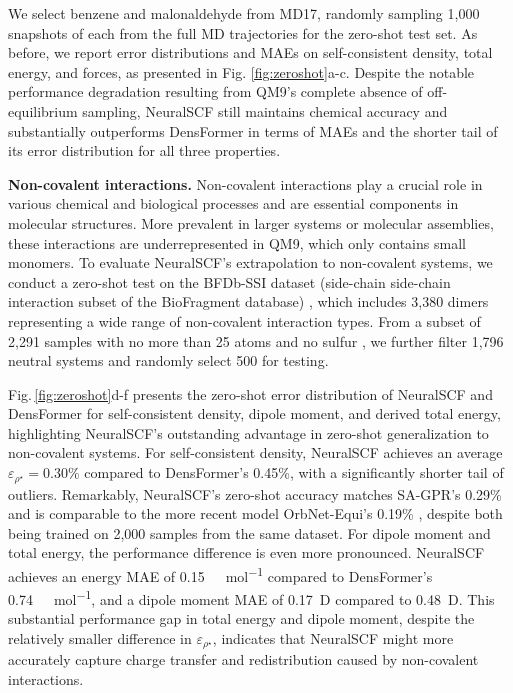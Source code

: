 \documentclass[%
reprint,
superscriptaddress,
bibnotes,
amsmath,amssymb,
aps,
floatfix, %
]{revtex4-2}
\begin{document}
We select benzene and malonaldehyde from MD17, randomly sampling 1,000 snapshots of each from the full MD trajectories for the zero-shot test set. As before, we report error distributions and MAEs on self-consistent density, total energy, and forces, as presented in Fig. \ref{fig:zeroshot}a-c. 
Despite the notable performance degradation resulting from QM9's complete absence of off-equilibrium sampling, NeuralSCF still maintains chemical accuracy and substantially outperforms DensFormer in terms of MAEs and the shorter tail of its error distribution for all three properties.

\vspace{\baselineskip}

\noindent\textbf{Non-covalent interactions.} Non-covalent interactions play a crucial role in various chemical and biological processes and are essential components in molecular structures. More prevalent in larger systems or molecular assemblies, these interactions are underrepresented in QM9, which only contains small monomers. To evaluate NeuralSCF's extrapolation to non-covalent systems, we conduct a zero-shot test on the BFDb-SSI dataset (side-chain side-chain interaction subset of the BioFragment database) \cite{burns2017biofragment}, which includes 3,380 dimers representing a wide range of non-covalent interaction types. From a subset of 2,291 samples with no more than 25 atoms and no sulfur \cite{fabrizio2019electron,qiao2022}, we further filter 1,796 neutral systems and randomly select 500 for testing.

Fig.\,\ref{fig:zeroshot}d-f presents the zero-shot error distribution of NeuralSCF and DensFormer for self-consistent density, dipole moment, and derived total energy, highlighting NeuralSCF's outstanding advantage in zero-shot generalization to non-covalent systems. For self-consistent density, NeuralSCF achieves an average $\varepsilon_{\rho^\star} = 0.30\%$ compared to DensFormer's 0.45\%, with a significantly shorter tail of outliers. Remarkably, NeuralSCF's zero-shot accuracy matches SA-GPR's 0.29\% \cite{fabrizio2019electron} and is comparable to the more recent model OrbNet-Equi's 0.19\% \cite{qiao2022}, despite both being trained on 2,000 samples from the same dataset. For dipole moment and total energy, the performance difference is even more pronounced. NeuralSCF achieves an energy MAE of \SI{0.15}{\kilo\cal\per\mol} compared to DensFormer's \SI{0.74}{\kilo\cal\per\mol}, and a dipole moment MAE of \SI{0.17}{D} compared to \SI{0.48}{D}. This substantial performance gap in total energy and dipole moment, despite the relatively smaller difference in $\varepsilon_{\rho^\star}$, indicates that NeuralSCF might more accurately capture charge transfer and redistribution caused by non-covalent interactions. 
\end{document}
